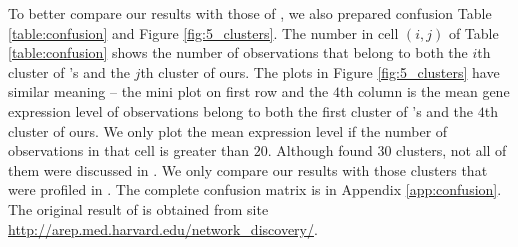 \documentclass[12pt]{article}
\begin{document}
To better compare our results with those of \cite{tavazoie1999systematic}, we also prepared confusion Table \ref{table:confusion} and Figure \ref{fig:5_clusters}. The number in cell $(i,j)$ of Table \ref{table:confusion} shows the number of observations that belong to both the $i$th cluster of \cite{tavazoie1999systematic}'s and the $j$th cluster of ours. The plots in Figure \ref{fig:5_clusters} have similar meaning -- the mini plot on first row and the $4$th column is the mean gene expression level of observations belong to both the first cluster of \cite{tavazoie1999systematic}'s and the $4$th cluster of ours. We only plot the mean expression level if the number of observations in that cell is greater than $20$. Although \cite{tavazoie1999systematic} found $30$ clusters, not all of them were discussed in \cite{tavazoie1999systematic}. We only compare our results with those clusters that were profiled in \cite{tavazoie1999systematic}. The complete confusion matrix is in Appendix \ref{app:confusion}. The original result of \cite{tavazoie1999systematic} is obtained from site \url{http://arep.med.harvard.edu/network_discovery/}.
\end{document}
